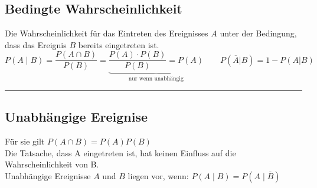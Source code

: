 \subsection{Bedingte Wahrscheinlichkeit \skript{\pageref{sk-def-bedingte-wahrscheinlichkeit}}}
Die Wahrscheinlichkeit für das Eintreten des Ereignisses $A$ unter der
Bedingung, dass das Ereignis $B$ bereits eingetreten ist.
\[\boxed{P(A\mid B)= \dfrac{P(A\cap B)}{P(B)}}=\underbrace{\frac{P(A)\cdot
  P(B)}{P(B)}=P(A)}_{\text{nur wenn unabhängig}} \qquad P(\overline{A}|B) = 1 -
  P(A|B)\]
  
\hrule

\subsection{Unabhängige Ereignise \skript{\pageref{sk-def-unabhaengige-ereignisse}}}
		Für sie gilt \hspace*{5mm} $\boxed{P(A\cap B)=P(A)P(B)}$\\
    	Die Tatsache, dass A eingetreten ist, hat keinen Einfluss auf die 
		Wahrscheinlichkeit von B.\\
		Unabhängige Ereignisse $A$ und $B$ liegen vor, wenn: 
		\hspace*{5mm} $P(A\mid B)=P(A\mid \overline{B})$ \\		

